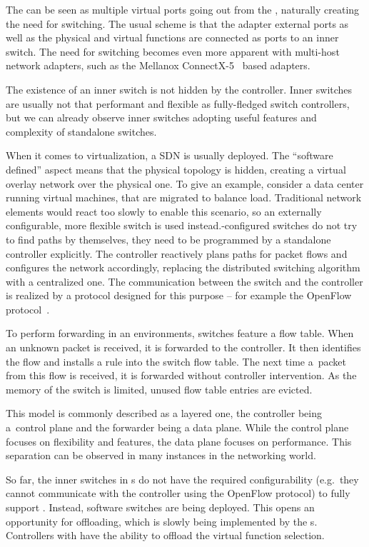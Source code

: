 The  can be seen as multiple virtual
ports going out from the , naturally creating the need for switching.
The usual scheme is that the adapter external ports as well as the physical and
virtual functions are connected as ports to an inner switch. The need for
switching becomes even more apparent with multi-host network adapters, such
as the Mellanox ConnectX-5~\cite{mlx5-pb} based adapters.

The existence of an inner switch is not hidden by the controller. Inner switches
are usually not that performant and flexible as fully-fledged switch controllers,
but we can already observe inner switches adopting useful features and
complexity of standalone switches.

When it comes to virtualization, a \acrfull{SDN} is usually
deployed. The ``software defined'' aspect means that the physical topology is
hidden, creating a virtual overlay network over the physical one.
To give an example, consider a data center running virtual machines, that are
migrated to balance load. Traditional network elements would react too
slowly to enable this scenario, so an externally configurable, more flexible
switch is used instead.-configured switches do not try to find paths by
themselves, they need to be programmed by a standalone  controller
explicitly. The controller reactively plans paths for packet flows and
configures the network accordingly, replacing the distributed switching
algorithm with a centralized one. The
communication between the switch and the controller is realized by a protocol
designed for this purpose -- for example the OpenFlow protocol~\cite{openflow}.

To perform forwarding in an  environments, switches feature a flow table. When
an unknown packet is received, it is forwarded to the controller. It then
identifies the flow and installs a rule into the switch flow table. The next time
a~packet from this flow is received, it is forwarded without controller
intervention. As the memory of the switch is limited, unused flow table entries
are evicted.

This model is commonly described as a layered one, the controller being
a~control plane and the forwarder being a data plane. While the control plane
focuses on flexibility and features, the data plane focuses on performance. This
separation can be observed in many instances in the networking world.

So far, the inner switches in s do not have the required configurability
(e.g.\ they cannot communicate with the controller using the OpenFlow protocol)
to fully support . Instead, software switches are being deployed. This
opens an opportunity for offloading, which is slowly being implemented by the
s. Controllers with  have the ability to offload the virtual
function selection.

